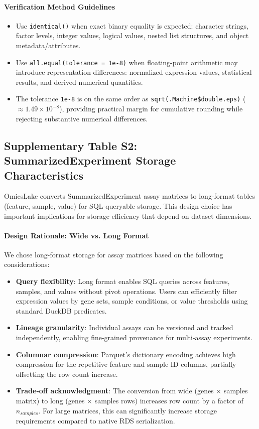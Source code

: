 \documentclass[11pt,a4paper]{article}
\begin{document}
\paragraph{Verification Method Guidelines}
\begin{itemize}
    \item Use \texttt{identical()} when exact binary equality is expected: character strings, factor levels, integer values, logical values, nested list structures, and object metadata/attributes.
    \item Use \texttt{all.equal(tolerance = 1e-8)} when floating-point arithmetic may introduce representation differences: normalized expression values, statistical results, and derived numerical quantities.
    \item The tolerance \texttt{1e-8} is on the same order as \texttt{sqrt(.Machine\$double.eps)} (\(\approx 1.49 \times 10^{-8}\)), providing practical margin for cumulative rounding while rejecting substantive numerical differences.
\end{itemize}

\subsection{Supplementary Table S2: SummarizedExperiment Storage Characteristics}

OmicsLake converts SummarizedExperiment assay matrices to long-format tables (feature, sample, value) for SQL-queryable storage. This design choice has important implications for storage efficiency that depend on dataset dimensions.

\paragraph{Design Rationale: Wide vs. Long Format}
We chose long-format storage for assay matrices based on the following considerations:

\begin{itemize}
    \item \textbf{Query flexibility}: Long format enables SQL queries across features, samples, and values without pivot operations. Users can efficiently filter expression values by gene sets, sample conditions, or value thresholds using standard DuckDB predicates.
    \item \textbf{Lineage granularity}: Individual assays can be versioned and tracked independently, enabling fine-grained provenance for multi-assay experiments.
    \item \textbf{Columnar compression}: Parquet's dictionary encoding achieves high compression for the repetitive feature and sample ID columns, partially offsetting the row count increase.
    \item \textbf{Trade-off acknowledgment}: The conversion from wide (genes $\times$ samples matrix) to long (genes $\times$ samples rows) increases row count by a factor of $n_{samples}$. For large matrices, this can significantly increase storage requirements compared to native RDS serialization.
\end{itemize}
\end{document}
